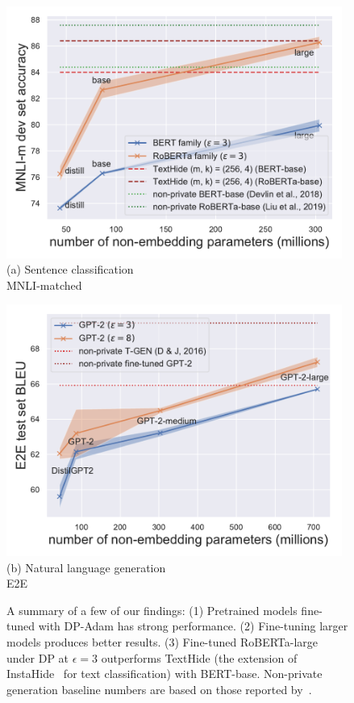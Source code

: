 \begin{figure}[t]
\begin{center}
\begin{minipage}[t]{0.48\linewidth}
\centering
{\includegraphics[width=0.98\textwidth]{figs/figure1_classification_v2.pdf}}
(a) Sentence classification \\MNLI-matched~\citep{williams2018multi}
\end{minipage}
\begin{minipage}[t]{0.48\linewidth}
\centering
{\includegraphics[width=0.98\textwidth]{figs/figure1_generation.pdf}}
(b) Natural language generation \\E2E~\citep{novikova2017e2e}
\end{minipage}
\end{center}
\caption{A summary of a few of our findings:
(1) Pretrained models fine-tuned with DP-Adam has strong performance. 
(2) Fine-tuning larger models produces better results. 
(3) Fine-tuned RoBERTa-large under DP at $\epsilon=3$ outperforms TextHide (the extension of InstaHide~\citep{huang2020instahide} for text classification) with BERT-base. 
Non-private generation baseline numbers are based on those reported by~\cite{wiseman2018learning}. 
}
\label{fig:fig1}
\end{figure}
